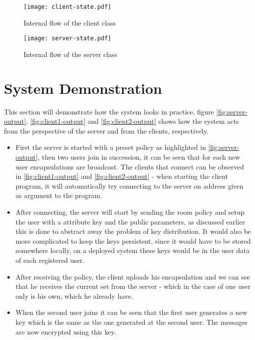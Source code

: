 \begin{figure}[H]
\centering
\texttt{[image: client-state.pdf]}
\caption{Internal flow of the client class}
\label{fig:client-state}
\end{figure}

\begin{figure}[h]
\centering
\texttt{[image: server-state.pdf]}
\caption{Internal flow of the server class}
\label{fig:server-state}
\end{figure}

\clearpage
\section{System Demonstration}\label{sec:demo}
This section will demonstrate how the system looks in practice, figure \ref{fig:server-output}, \ref{fig:client1-output} and \ref{fig:client2-output} shows how the system acts from the perspective of the server and from the clients, respectively. 
\begin{itemize}
\item First the server is started with a preset policy as highlighted in \ref{fig:server-output}, then two users join in succession, it can be seen that for each new user encapsulations are broadcast. The clients that connect can be observed in \ref{fig:client1-output} and \ref{fig:client2-output}  - when starting the client program, it will automatically try connecting to the server on address given as argument to the program. 
\item After connecting, the server will start by sending the room policy and setup the user with a attribute key and the public parameters, as discussed earlier this is done to abstract away the problem of key distribution. It would also be more complicated to keep the keys persistent, since it would have to be stored somewhere locally, on a deployed system these keys would be in the user data of each registered user. 
\item After receiving the policy, the client uploads his encapsulation and we can see that he receives the current set from the server - which in the case of one user only is his own, which he already have. 
\item When the second user joins it can be seen that the first user generates a new key which is the same as the one generated at the second user. The messages are now encrypted using this key.
\end{itemize}


